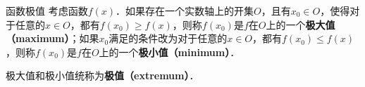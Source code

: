 

\begin{definition}{函数极值}
考虑函数$f(x)$．如果存在一个实数轴上的开集$O$，且有$x_0\in O$，使得对于任意的$x\in O$，都有$f(x_0)\geq f(x)$，则称$f(x_0)$是$f$在$O$上的一个\textbf{极大值（maximum）}；如果$x_0$满足的条件改为对于任意的$x\in O$，都有$f(x_0)\leq f(x)$，则称$f(x_0)$是$f$在$O$上的一个\textbf{极小值（minimum）}．

极大值和极小值统称为\textbf{极值（extremum）}．
\end{definition}















